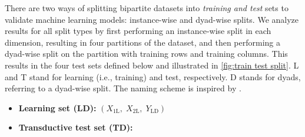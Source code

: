 \documentclass[letterpaper]{article}
\begin{document}
There are two ways of splitting bipartite datasets into \emph{training and test} sets to validate machine learning models: instance-wise and dyad-wise splits.
We analyze results for all split types by first performing an instance-wise split in each dimension, resulting in four partitions of the dataset, and then performing a dyad-wise split on the partition with training rows and training columns.
This results in the four test sets defined below and illustrated in \cref{fig:train test split}. L and T stand for learning (i.e., training) and test, respectively. D stands for dyads, referring to a dyad-wise split.
The naming scheme is inspired by \citet{schrynemackers_protocols_2013,pliakos_global_2018}.
%
\begin{itemize}
    \item \textbf{Learning set (LD):}
    $(X_\text{1L},\;X_\text{2L}, \;Y_\text{LD})$
    \item \textbf{Transductive test set (TD):}

\end{itemize}
\end{document}
